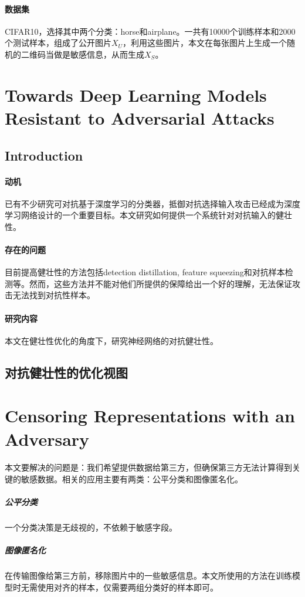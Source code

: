 \documentclass[12pt,a4paper]{article}
\begin{document}
\paragraph{数据集} CIFAR10，选择其中两个分类：horse和airplane。一共有10000个训练样本和2000个测试样本，组成了公开图片$X_U$，利用这些图片，本文在每张图片上生成一个随机的二维码当做是敏感信息，从而生成$X_S$。


\section{Towards Deep Learning Models Resistant to Adversarial Attacks}
\subsection{Introduction}
\paragraph{动机} 已有不少研究可对抗基于深度学习的分类器，抵御对抗选择输入攻击已经成为深度学习网络设计的一个重要目标。本文研究如何提供一个系统针对对抗输入的健壮性。
\paragraph{存在的问题} 目前提高健壮性的方法包括detection distillation, feature squeezing和对抗样本检测等。然而，这些方法并不能对他们所提供的保障给出一个好的理解，无法保证攻击无法找到对抗性样本。
\paragraph{研究内容} 本文在健壮性优化的角度下，研究神经网络的对抗健壮性。
\subsection{对抗健壮性的优化视图}


\newpage
\section{Censoring Representations with an Adversary\cite{censoring}}
\paragraph{} 本文要解决的问题是：我们希望提供数据给第三方，但确保第三方无法计算得到关键的敏感数据。相关的应用主要有两类：公平分类和图像匿名化。
	\subparagraph{公平分类} 一个分类决策是无歧视的，不依赖于敏感字段。
	\subparagraph{图像匿名化} 在传输图像给第三方前，移除图片中的一些敏感信息。本文所使用的方法在训练模型时无需使用对齐的样本，仅需要两组分类好的样本即可。
\end{document}
